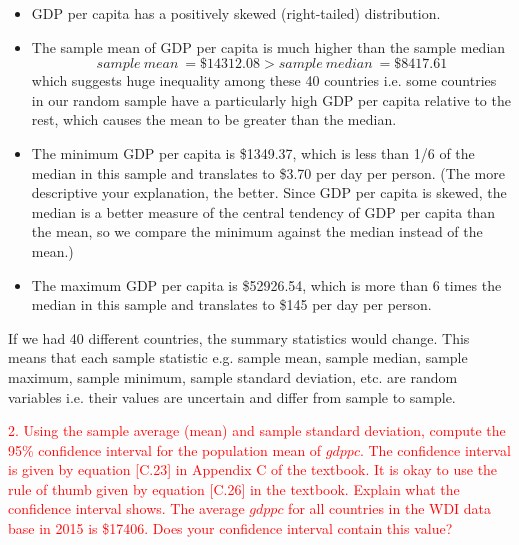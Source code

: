 \documentclass[12pt]{report}
\begin{document}
\begin{itemize}
	\item GDP per capita has a positively skewed (right-tailed) distribution.
	\item The sample mean of GDP per capita is much higher than the sample median $$sample\ mean\ = \$14312.08 > sample\ median\ = \$8417.61$$ which suggests huge inequality among these 40 countries i.e. some countries in our random sample have a particularly high GDP per capita relative to the rest, which causes the mean to be greater than the median.
	\item The minimum GDP per capita is \$1349.37, which is less than 1/6 of the median in this sample and translates to \$3.70 per day per person. (The more descriptive your explanation, the better. Since GDP per capita is skewed, the median is a better measure of the central tendency of GDP per capita than the mean, so we compare the minimum against the median instead of the mean.)
	\item The maximum GDP per capita is \$52926.54, which is more than 6 times the median in this sample and translates to \$145 per day per person.
\end{itemize}
\noindent If we had 40 different countries, the summary statistics would change. This means that each sample statistic e.g. sample mean, sample median, sample maximum, sample minimum, sample standard deviation, etc. are random variables i.e. their values are uncertain and differ from sample to sample.



\newpage
\noindent \textcolor{red}{2. Using the sample average (mean) and sample standard deviation, compute the 95\% confidence interval for the population mean of $gdppc$. The confidence interval is given by equation [C.23] in Appendix C of the textbook. It is okay to use the rule of thumb given by equation [C.26] in the textbook. Explain what the confidence interval shows. The average $gdppc$ for all countries in the WDI data base in 2015 is \$17406. Does your confidence interval contain this value?}
\end{document}
